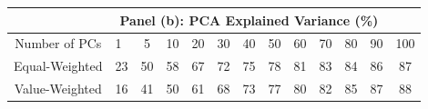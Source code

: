 \begin{tabular}{clccccccccccc}
  \toprule
 & \multicolumn{11}{c}{Panel (b): PCA Explained Variance (\%)} \\
  \midrule
Number of PCs & 1 & 5 & 10 & 20 & 30 & 40 & 50 & 60 & 70 & 80 & 90 & 100 \\ 
\midrule
  Equal-Weighted & 23 & 50 & 58 & 67 & 72 & 75 & 78 & 81 & 83 & 84 & 86 & 87 \\ 
  Value-Weighted & 16 & 41 & 50 & 61 & 68 & 73 & 77 & 80 & 82 & 85 & 87 & 88 \\ 
   \bottomrule
\end{tabular}
